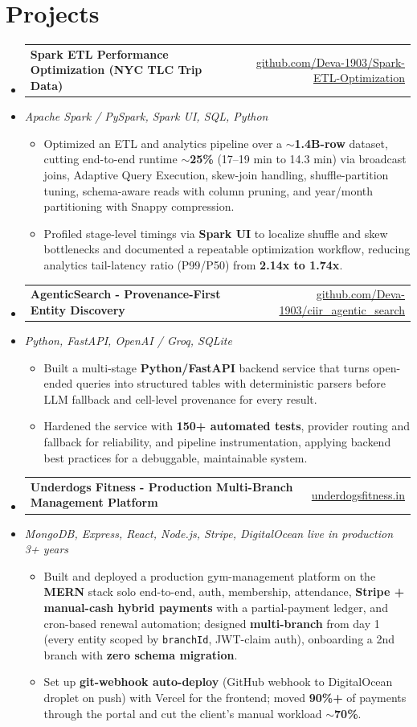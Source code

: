 \documentclass[letterpaper,10pt]{article}
\makeatletter
\newcommand{\resumeItem}[1]{
  \item\small{#1\vspace{-1pt}}
}
\newcommand{\resumeProjectHeading}[2]{
    \item
    \begin{tabular*}{0.985\textwidth}[t]{l@{\extracolsep{\fill}}r}
      \small\textbf{#1} & \small #2 \\
    \end{tabular*}\vspace{-5pt}
}
\newcommand{\resumeProjectSubheading}[1]{
  \vspace{-2pt}\item[] {\small\textcolor{ResumeSlate}{\emph{#1}}}\vspace{-3pt}
}
\newcommand{\resumeSubHeadingListStart}{\begin{itemize}[leftmargin=0.0in, label={}, itemsep=2pt, topsep=2pt]}
\newcommand{\resumeSubHeadingListEnd}{\end{itemize}}
\newcommand{\resumeItemListStart}{\begin{itemize}[leftmargin=0.18in, itemsep=2pt, topsep=1pt]}
\newcommand{\resumeItemListEnd}{\end{itemize}\vspace{-4pt}}
\makeatother
\begin{document}
\section{Projects}
\resumeSubHeadingListStart
  \resumeProjectHeading
    {Spark ETL Performance Optimization (NYC TLC Trip Data)}
    {\href{https://github.com/Deva-1903/Spark-ETL-Optimization}{github.com/Deva-1903/Spark-ETL-Optimization}}
  \resumeProjectSubheading{Apache Spark / PySpark, Spark UI, SQL, Python}
    \resumeItemListStart
      \resumeItem{Optimized an ETL and analytics pipeline over a \textbf{$\sim$1.4B-row} dataset, cutting end-to-end runtime \textbf{$\sim$25\%} (17--19 min to 14.3 min) via broadcast joins, Adaptive Query Execution, skew-join handling, shuffle-partition tuning, schema-aware reads with column pruning, and year/month partitioning with Snappy compression.}
      \resumeItem{Profiled stage-level timings via \textbf{Spark UI} to localize shuffle and skew bottlenecks and documented a repeatable optimization workflow, reducing analytics tail-latency ratio (P99/P50) from \textbf{2.14x to 1.74x}.}
    \resumeItemListEnd
  \resumeProjectHeading
    {AgenticSearch - Provenance-First Entity Discovery}
    {\href{https://github.com/Deva-1903/ciir_agentic_search}{github.com/Deva-1903/ciir\_agentic\_search}}
  \resumeProjectSubheading{Python, FastAPI, OpenAI / Groq, SQLite}
    \resumeItemListStart
      \resumeItem{Built a multi-stage \textbf{Python/FastAPI} backend service that turns open-ended queries into structured tables with deterministic parsers before LLM fallback and cell-level provenance for every result.}
      \resumeItem{Hardened the service with \textbf{150+ automated tests}, provider routing and fallback for reliability, and pipeline instrumentation, applying backend best practices for a debuggable, maintainable system.}
    \resumeItemListEnd
  \resumeProjectHeading
    {Underdogs Fitness - Production Multi-Branch Management Platform}
    {\href{https://www.underdogsfitness.in}{underdogsfitness.in}}
  \resumeProjectSubheading{MongoDB, Express, React, Node.js, Stripe, DigitalOcean \enspace\textbar\enspace live in production 3+ years}
    \resumeItemListStart
      \resumeItem{Built and deployed a production gym-management platform on the \textbf{MERN} stack solo end-to-end, auth, membership, attendance, \textbf{Stripe + manual-cash hybrid payments} with a partial-payment ledger, and cron-based renewal automation; designed \textbf{multi-branch} from day 1 (every entity scoped by \texttt{branchId}, JWT-claim auth), onboarding a 2nd branch with \textbf{zero schema migration}.}
      \resumeItem{Set up \textbf{git-webhook auto-deploy} (GitHub webhook to DigitalOcean droplet on push) with Vercel for the frontend; moved \textbf{90\%+} of payments through the portal and cut the client's manual workload \textbf{$\sim$70\%}.}
    \resumeItemListEnd
\resumeSubHeadingListEnd
\vspace{-4pt}
\end{document}
